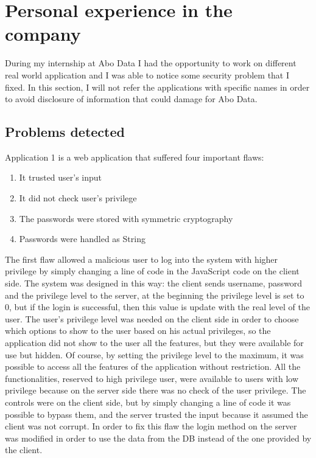 \section{Personal experience in the company}

During my internship at Abo Data I had the opportunity to work on different real world application and I was able to notice some security problem that I fixed.\newline
In this section, I will not refer the applications with specific names in order to avoid disclosure of information that could damage for Abo Data.

\subsection{Problems detected}
Application 1 is a web application that suffered four important flaws:
\begin{enumerate}
	\item It trusted user’s input
	\item It did not check user’s privilege
	\item The passwords were stored with symmetric cryptography
	\item Passwords were handled as String
\end{enumerate}

The first flaw allowed a malicious user to log into the system with higher privilege by simply changing a line of code in the JavaScript code on the client side.\newline
The system was designed in this way: the client sends username, password and the privilege level to the server, at the beginning the privilege level is set to 0, but if the login is successful, then this value is update with the real level of the user.\newline
The user’s privilege level was needed on the client side in order to choose which options to show to the user based on his actual privileges, so the application did not show to the user all the features, but they were available for use but hidden.\newline
Of course, by setting the privilege level to the maximum, it was possible to access all the features of the application without restriction.\newline
All the functionalities, reserved to high privilege user, were available to users with low privilege because on the server side there was no check of the user privilege.\newline
The controls were on the client side, but by simply changing a line of code it was possible to bypass them, and the server trusted the input because it assumed the client was not corrupt.\newline
In order to fix this flaw the login method on the server was modified in order to use the data from the DB instead of the one provided by the client.\newline


